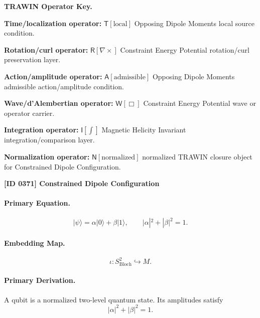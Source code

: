 \par\vspace{0.45\baselineskip}
\noindent\begin{minipage}[t]{\linewidth}
\begingroup
\small
\raggedright
\textbf{TRAWIN Operator Key.}\par
\noindent\textbf{Time/localization operator:} $\mathsf{T}\!\left[\mathrm{local}\right]$ Opposing Dipole Moments local source condition.\par
\noindent\textbf{Rotation/curl operator:} $\mathsf{R}\!\left[\nabla\times\right]$ Constraint Energy Potential rotation/curl preservation layer.\par
\noindent\textbf{Action/amplitude operator:} $\mathsf{A}\!\left[\mathrm{admissible}\right]$ Opposing Dipole Moments admissible action/amplitude condition.\par
\noindent\textbf{Wave/d'Alembertian operator:} $\mathsf{W}\!\left[\Box\right]$ Constraint Energy Potential wave or operator carrier.\par
\noindent\textbf{Integration operator:} $\mathsf{I}\!\left[\int\right]$ Magnetic Helicity Invariant integration/comparison layer.\par
\noindent\textbf{Normalization operator:} $\mathsf{N}\!\left[\mathrm{normalized}\right]$ normalized TRAWIN closure object for Constrained Dipole Configuration.\par
\endgroup
\end{minipage}

\clearpage
\noindent\textbf{[ID 0371] Constrained Dipole Configuration}\par
\vspace{0.35em}
\paragraph{Primary Equation.}
\begin{equation}
|\psi\rangle = \alpha|0\rangle+\beta|1\rangle,
\qquad
|\alpha|^2+|\beta|^2=1 .
\end{equation}

\paragraph{Embedding Map.}
\begin{equation}
\iota:S^2_{\mathrm{Bloch}}\hookrightarrow M .
\end{equation}

\paragraph{Primary Derivation.}
A qubit is a normalized two-level quantum state. Its amplitudes satisfy
\begin{equation}
|\alpha|^2+|\beta|^2=1 .
\end{equation}

